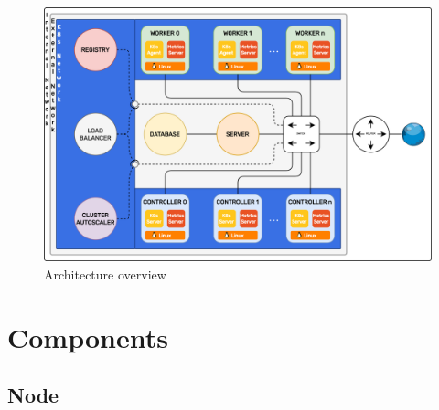 \begin{figure}[htbp]
  \centering
  \includegraphics[width=.9\textwidth]{images/recluster/architecture.png}
  \caption{Architecture overview}
\end{figure}

\section{Components}
\label{sec:architecture_components}

\subsection{Node}
\label{subsec:architecture_components_node}

